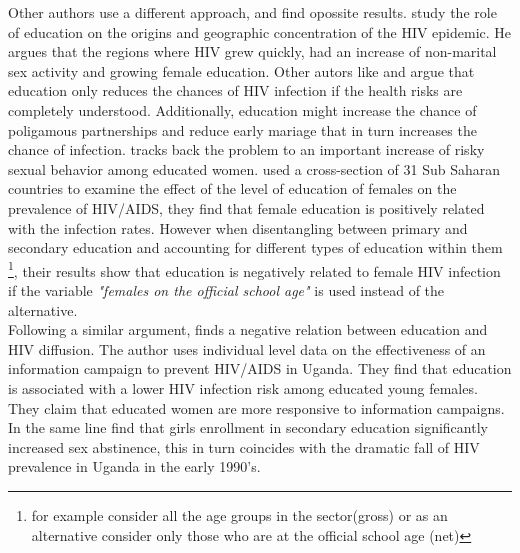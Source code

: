 Other authors use a different approach, and find opossite results. \cite{paxton} study the role of education on the origins and geographic concentration of the HIV epidemic. He argues that the regions where HIV grew quickly, had an increase of non-marital sex activity and growing female education. Other autors like \cite{preston} and \cite{bledsoe} argue that education only reduces the chances of HIV infection if the health risks are completely understood. Additionally, education might increase the chance of poligamous partnerships and reduce early mariage that in turn increases the chance of infection.\cite{oster} tracks back the problem to an important increase of risky sexual behavior among educated women. \cite{brent} used a cross-section of 31 Sub Saharan countries to examine the effect of the level of education of females on the prevalence of HIV/AIDS, they find that female education is positively related with the infection rates. However when disentangling between primary and secondary education and accounting for different types of education within them \footnote{for example consider all the age groups in the sector(gross) or  as an alternative consider only those who are at the official school age (net)}, their results show that education is negatively related to female HIV infection if the variable \textit{"females on the official school age"} is used instead of the alternative.\\

Following a similar argument, \cite{walque} finds a negative relation between education and HIV diffusion. The author uses individual level data on the effectiveness of an information campaign  to prevent HIV/AIDS in Uganda. They find that education is associated with a lower HIV infection risk among educated young females.  They claim that educated women are more responsive to information campaigns. In the same line \cite{alsan} find that girls enrollment in secondary education significantly increased sex abstinence, this in turn coincides with the dramatic fall of HIV prevalence in Uganda in the early 1990's.\\

